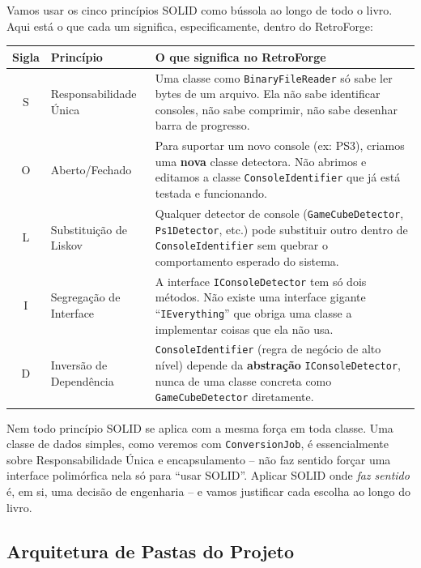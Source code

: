 Vamos usar os cinco princípios SOLID como bússola ao longo de todo o livro. Aqui está o que cada um significa, especificamente, dentro do RetroForge:

\begin{center}
\begin{tabular}{|>{\ttfamily}c|p{2.1cm}|p{7.3cm}|}
\hline
\textbf{Sigla} & \textbf{Princípio} & \textbf{O que significa no RetroForge} \\
\hline
S & Responsabilidade Única & Uma classe como \texttt{BinaryFileReader} só sabe ler bytes de um arquivo. Ela não sabe identificar consoles, não sabe comprimir, não sabe desenhar barra de progresso. \\
\hline
O & Aberto/Fechado & Para suportar um novo console (ex: PS3), criamos uma \textbf{nova} classe detectora. Não abrimos e editamos a classe \texttt{ConsoleIdentifier} que já está testada e funcionando. \\
\hline
L & Substituição de Liskov & Qualquer detector de console (\texttt{GameCubeDetector}, \texttt{Ps1Detector}, etc.) pode substituir outro dentro de \texttt{ConsoleIdentifier} sem quebrar o comportamento esperado do sistema. \\
\hline
I & Segregação de Interface & A interface \texttt{IConsoleDetector} tem só dois métodos. Não existe uma interface gigante ``\texttt{IEverything}'' que obriga uma classe a implementar coisas que ela não usa. \\
\hline
D & Inversão de Dependência & \texttt{ConsoleIdentifier} (regra de negócio de alto nível) depende da \textbf{abstração} \texttt{IConsoleDetector}, nunca de uma classe concreta como \texttt{GameCubeDetector} diretamente. \\
\hline
\end{tabular}
\end{center}

\begin{CaixaInfo}
Nem todo princípio SOLID se aplica com a mesma força em toda classe. Uma classe de dados simples, como veremos com \texttt{ConversionJob}, é essencialmente sobre Responsabilidade Única e encapsulamento -- não faz sentido forçar uma interface polimórfica nela só para ``usar SOLID''. Aplicar SOLID onde \textit{faz sentido} é, em si, uma decisão de engenharia -- e vamos justificar cada escolha ao longo do livro.
\end{CaixaInfo}

\subsection{Arquitetura de Pastas do Projeto}

